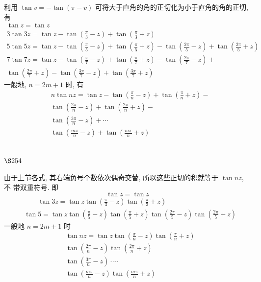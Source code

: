 利用 $\tan v=-\tan (\pi-v)$ 可将大于直角的角的正切化为小于直角的角的正切, 有
\[
\begin{gathered}
\tan z=\tan z \\
3 \tan 3 z=\tan z-\tan \left(\frac{\pi}{3}-z\right)+\tan \left(\frac{\pi}{3}+z\right) \\
5 \tan 5 z=\tan z-\tan \left(\frac{\pi}{5}-z\right)+\tan \left(\frac{\pi}{5}+z\right)-\tan \left(\frac{2 \pi}{5}-z\right)+\tan \left(\frac{2 \pi}{5}+z\right) \\
7 \tan 7 z=\tan z-\tan \left(\frac{\pi}{7}-z\right)+\tan \left(\frac{\pi}{7}+z\right)-\tan \left(\frac{2 \pi}{7}-z\right)+ \\
\tan \left(\frac{2 \pi}{7}+z\right)-\tan \left(\frac{3 \pi}{7}-z\right)+\tan \left(\frac{3 \pi}{7}+z\right)
\end{gathered}
\]
一般地, $n=2 m+1$ 时, 有
\[
\begin{aligned}
& n \tan n z=\tan z-\tan \left(\frac{\pi}{n}-z\right)+\tan \left(\frac{\pi}{n}+z\right)- \\
& \tan \left(\frac{2 \pi}{n}-z\right)+\tan \left(\frac{2 \pi}{n}+z\right)- \\
& \tan \left(\frac{3 \pi}{n}-z\right)+\cdots \\
& \tan \left(\frac{m \pi}{n}-z\right)+\tan \left(\frac{m \pi}{n}+z\right)
\end{aligned}
\]
\section{$\S 254$}

由于上节各式, 其右端负号个数依次偶奇交替, 所以这些正切的积就等于 $\tan n z$, 不 带双重符号. 即
\[
\tan z=\tan z
\]
\[
\begin{aligned}
& \qquad \tan 3 z=\tan z \tan \left(\frac{\pi}{3}-z\right) \tan \left(\frac{\pi}{3}+z\right) \\
& \tan 5=\tan z \tan \left(\frac{\pi}{5}-z\right) \tan \left(\frac{\pi}{5}+z\right) \tan \left(\frac{2 \pi}{5}-z\right) \tan \left(\frac{2 \pi}{5}+z\right)
\end{aligned}
\]
一般地 $n=2 m+1$ 时
\[
\begin{aligned}
& \tan n z= \tan z \tan \left(\frac{\pi}{n}-z\right) \tan \left(\frac{\pi}{n}+z\right) \\
& \tan \left(\frac{2 \pi}{n}-z\right) \tan \left(\frac{2 \pi}{n}+z\right) \\
& \tan \left(\frac{3 \pi}{n}-z\right) \cdot \cdots \\
& \tan \left(\frac{m \pi}{n}-z\right) \tan \left(\frac{m \pi}{n}+z\right) 
\end{aligned}
\]
